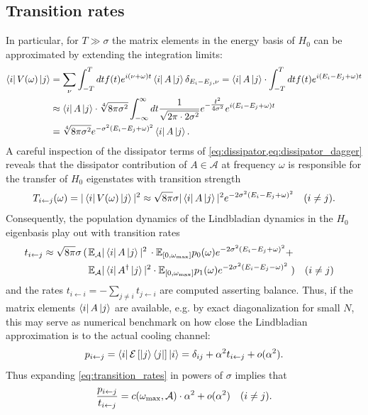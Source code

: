 \documentclass[12pt,a4paper]{article}
\newcommand{\SA}[1]{{\color{orange}{[SA: #1]}}}
\begin{document}
\subsection{Transition rates}
In particular, for $T\gg \sigma$ the matrix elements in the energy basis of $H_0$ can be approximated by extending the integration limits: 
\begin{align}
    \bra{i} V(\omega) \ket{j}&= \sum_{\nu}\int_{-T}^Tdt  f(t)e^{i(\nu+\omega)t} \bra{i}A \ket{j} \delta_{E_i-E_j,\nu}=
     \bra{i}A \ket{j} \cdot \int_{-T}^Tdt f(t)  e^{i(E_i-E_j+\omega)t}\nonumber\\ 
     &\approx \bra{i}A \ket{j} \cdot \sqrt[4]{8 \pi \sigma^2} \int_{-\infty}^{\infty}dt \frac{1}{\sqrt{2\pi \cdot 2\sigma^2}} e^{-\tfrac{t^2}{4\sigma^2}}  e^{i(E_i-E_j+\omega)t} \nonumber\\
     &= \sqrt[4]{8 \pi \sigma^2} e^{-\sigma^2(E_i-E_j+\omega)^2}\bra{i}A \ket{j}.
\end{align}
A careful inspection of the dissipator terms of \cref{eq:dissipator,eq:dissipator_dagger} %
reveals that the dissipator contribution of $A\in\mathcal{A}$ at frequency $\omega$ is responsible for the transfer of $H_0$ eigenstates with transition strength
\begin{align}
    T_{i\leftarrow j}(\omega) = |\bra{i} V(\omega) \ket{j}|^2 \approx 
    \sqrt {8 \pi} \sigma |\bra{i}A \ket{j}|^2 e^{-2\sigma^2(E_i-E_j+\omega)^2} &&(i\neq j).
\end{align}
Consequently, the population dynamics of the Lindbladian dynamics in the $H_0$ eigenbasis play out with transition rates
\begin{align}\notag
    t_{i\leftarrow j} \approx     \sqrt {8 \pi} \sigma \left( \right.&\mathbb{E}_{\mathcal{A}}
     |\bra{i}A \ket{j}|^2\,\cdot \mathbb{E}_{[0, \omega_{\rm max}]} p_0(\omega) e^{-2\sigma^2(E_i-E_j+\omega)^2} +\\ \label{eq:transition_rates}& \mathbb{E}_{\mathcal{A}}
     |\bra{i}A^{\dagger} \ket{j}|^2\cdot \mathbb{E}_{[0, \omega_{\rm max}]} p_1(\omega) e^{-2\sigma^2(E_i-E_j-\omega)^2}\left.\right)&&(i\neq j)
\end{align}
and the rates $t_{i\leftarrow i} = - \displaystyle\sum_{j\neq i} t_{j\leftarrow i}$ are computed asserting balance. Thus, if the matrix elements $\bra{i}A \ket{j}$ are available, e.g. by exact diagonalization for small $N$, 
this may serve as numerical benchmark on how close the Lindbladian approximation is to the actual cooling channel:
\begin{align}\label{eq:lindbladian_benchmark}
   p_{i\leftarrow j} = \bra{i} \mathcal{E}\left[\ket{j}\bra{j}\right]\ket{i} =  \delta_{ij} + \alpha^2 t_{i\leftarrow j} + o(\alpha^2).
\end{align}
Thus expanding \cref{eq:transition_rates} in powers of $\sigma$ implies that 
\begin{align}\label{eq:pt_expansion}
    \frac{p_{i\leftarrow j}}{t_{i\leftarrow j}}= c(\omega_{\rm max}, \mathcal{A})\cdot \alpha^2  + o(\alpha^2 )&&(i\neq j). 
\end{align}
\end{document}
